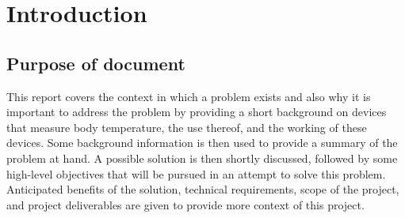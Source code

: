 \setcounter{page}{1}
\chapter{Introduction}\label{Ch1}

\section{Purpose of document}
This report covers the context in which a problem exists and also why it is important to address the problem by providing a short background on devices that measure body temperature, the use thereof, and the working of these devices. Some background information is then used to provide a summary of the problem at hand. A possible solution is then shortly discussed, followed by some high-level objectives that will be pursued in an attempt to solve this problem. Anticipated benefits of the solution, technical requirements, scope of the project, and project deliverables are given to provide more context of this project. 


